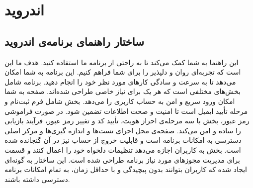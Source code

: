 \chapter{اندروید}
\section{ساختار راهنمای برنامه‌ی اندروید}
این راهنما به شما کمک می‌کند تا به راحتی از برنامه ما استفاده کنید. هدف ما این است که تجربه‌ای روان و دلپذیر را برای شما فراهم کنیم. این برنامه به شما امکان می‌دهد تا به سرعت و سادگی کارهای مورد نظر خود را انجام دهید.  
برنامه شامل بخش‌های مختلفی است که هر یک برای نیاز خاصی طراحی شده‌اند. صفحه  به شما امکان ورود سریع و امن به حساب کاربری را می‌دهد. بخش  شامل فرم ثبت‌نام و مرحله تأیید ایمیل است تا امنیت و صحت اطلاعات تضمین شود. در صورت فراموشی رمز عبور، بخش  با سه مرحله‌ی احراز هویت، تأیید کد و تغییر رمز عبور، فرآیند بازیابی را ساده و امن می‌کند. صفحه‌ی  محل اجرای تست‌ها و اندازه گیری‌ها و مرکز اصلی دسترسی به امکانات برنامه است و قابلیت خروج از حساب نیز در آن گنجانده شده است. بخش  به کاربران اجازه می‌دهد تنظیمات دلخواه خود را اعمال کنند و قسمت  برای مدیریت مجوزهای مورد نیاز برنامه طراحی شده است. این ساختار به گونه‌ای ایجاد شده که کاربران بتوانند بدون پیچیدگی و با حداقل زمان، به تمام امکانات برنامه دسترسی داشته باشند.

